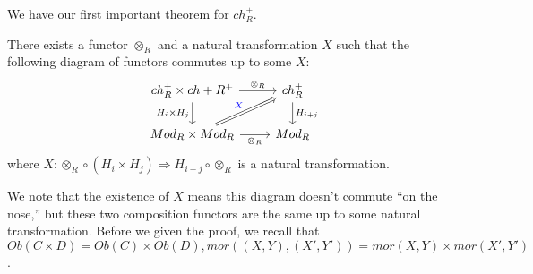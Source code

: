 We have our first important theorem for $ch_R^+$.
\begin{thm}
    There exists a functor $\otimes_R$ and a natural transformation $X$ such that the following diagram of functors commutes up to some $X$:
    \[\begin{tikzcd}
        {ch_R^+\times ch+R^+} & {ch_R^+} \\
        {Mod_R\times Mod_R} & {Mod_R}
        \arrow["{\otimes_R}", from=1-1, to=1-2]
        \arrow["{H_i\times H_j}"', from=1-1, to=2-1]
        \arrow["{H_{i+j}}", from=1-2, to=2-2]
        \arrow["{\textcolor{blue}{X}}", Rightarrow, from=2-1, to=1-2]
        \arrow["{\otimes_R}"', from=2-1, to=2-2]
    \end{tikzcd}\]
    where $X: \otimes_R\circ(H_i\times H_j)\Rightarrow H_{i+j}\circ\otimes_R$ is a natural transformation.
\end{thm}
We note that the existence of $X$ means this diagram doesn't commute ``on the nose,'' but these two composition functors are the same up to some natural transformation. Before we given the proof, we recall that $Ob(C\times D)=Ob(C)\times Ob(D), mor((X,Y), (X',Y'))=mor(X,Y)\times mor(X',Y')$.
